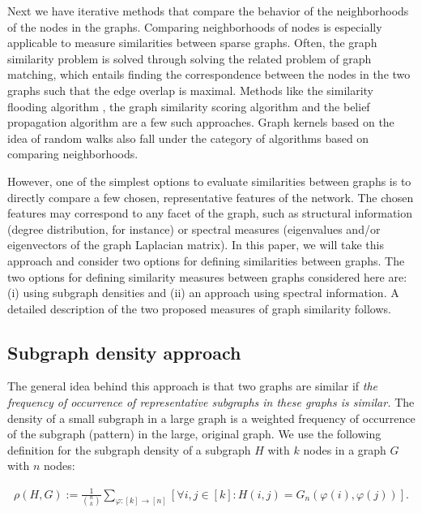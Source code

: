 % 
Next we have iterative methods that compare the behavior of the
neighborhoods of the nodes in the graphs.
% 
Comparing neighborhoods of nodes is especially applicable to measure
similarities between sparse graphs.
% 
Often, the graph similarity problem is solved through solving the
related problem of graph matching, which entails finding the
correspondence between the nodes in the two graphs such that the edge
overlap is maximal.
% 
Methods like the similarity flooding algorithm
\cite{melnik_similarity_2002}, the graph similarity scoring algorithm
\cite{zager_graph_2008} and the belief propagation algorithm
\cite{bayati_message-passing_2013} are a few such approaches.
% 
Graph kernels based on the idea of random walks
\cite{gartner_graph_2003,kashima_marginalized_2003,mahe_extensions_2004} also fall
under the category of algorithms based on comparing neighborhoods.

% 
However, one of the simplest options to evaluate similarities between
graphs is to directly compare a few chosen, representative features of
the network.
% 
The chosen features may correspond to any facet of the graph, such as
structural information (degree distribution, for instance) or spectral
measures (eigenvalues and/or eigenvectors of the graph Laplacian
matrix).
% 
In this paper, we will take this approach and consider two options for
defining similarities between graphs.
% 
The two options for defining similarity measures between graphs
considered here are: (i) using subgraph densities and (ii) an approach
using spectral information.
% 
A detailed description of the two proposed measures of graph
similarity follows.

\subsection{\label{ss:den} Subgraph density approach}

The general idea behind this approach is that two graphs are similar
if {\em the frequency of occurrence of representative subgraphs in
  these graphs is similar.}
% 
The density of a small subgraph in a large graph is a weighted
frequency of occurrence of the subgraph (pattern) in the large,
original graph.
% 
We use the following definition for the subgraph density of a subgraph
$H$ with $k$ nodes in a graph $G$ with $n$ nodes:

\begin{align}
  \label{eqn:homdenG}
  \rho(H,G) := \frac{1}{{n\choose k}} \!  \sum_{\varphi:[k] \to [n]} \!
  \left[ \forall  i, j \in [k] \! : \! H(i,j) \! = \! G_n(\varphi(i),
  \varphi(j)) \right].
\end{align}

